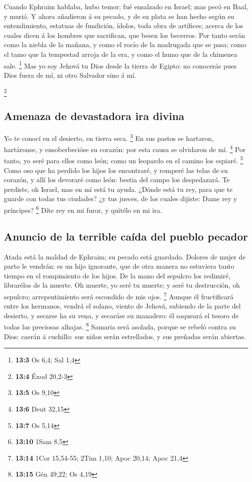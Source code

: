  Cuando Ephraim hablaba, hubo temor; fué ensalzado en
Israel; mas pecó en Baal, y murió.  Y ahora añadieron á su
pecado, y de su plata se han hecho según su entendimiento, estatuas de
fundición, ídolos, toda obra de artífices; acerca de los cuales dicen á
los hombres que sacrifican, que besen los becerros.  Por
tanto serán como la niebla de la mañana, y como el rocío de la madrugada
que se pasa; como el tamo que la tempestad arroja de la era, y como el
humo que de la chimenea sale. \footnote{\textbf{13:3} Os 6,4; Sal 1,4}
 Mas yo soy Jehová tu Dios desde la tierra de Egipto: no
conocerás pues Dios fuera de mí, ni otro Salvador sino á mí.

\footnote{\textbf{13:4} Éxod 20,2-3}

\hypertarget{amenaza-de-devastadora-ira-divina}{%
\subsection{Amenaza de devastadora ira
divina}\label{amenaza-de-devastadora-ira-divina}}

 Yo te conocí en el desierto, en tierra seca. \footnote{\textbf{13:5}
  Os 9,10}  En sus pastos se hartaron, hartáronse, y
ensoberbecióse su corazón: por esta causa se olvidaron de mí.
\footnote{\textbf{13:6} Deut 32,15}  Por tanto, yo seré para
ellos como león; como un leopardo en el camino los espiaré. \footnote{\textbf{13:7}
  Os 5,14}  Como oso que ha perdido los hijos los
encontraré, y romperé las telas de su corazón, y allí los devoraré como
león: bestia del campo los despedazará.  Te perdiste, oh
Israel, mas en mí está tu ayuda.  ¿Dónde está tu rey, para
que te guarde con todas tus ciudades? ¿y tus jueces, de los cuales
dijiste: Dame rey y príncipes? \footnote{\textbf{13:10} 1Sam 8,5}
 Díte rey en mi furor, y quitélo en mi ira.

\hypertarget{anuncio-de-la-terrible-cauxedda-del-pueblo-pecador}{%
\subsection{Anuncio de la terrible caída del pueblo
pecador}\label{anuncio-de-la-terrible-cauxedda-del-pueblo-pecador}}

 Atada está la maldad de Ephraim; su pecado está guardado.
 Dolores de mujer de parto le vendrán: es un hijo
ignorante, que de otra manera no estuviera tanto tiempo en el
rompimiento de los hijos.  De la mano del sepulcro los
redimiré, librarélos de la muerte. Oh muerte, yo seré tu muerte; y seré
tu destrucción, oh sepulcro; arrepentimiento será escondido de mis ojos.
\footnote{\textbf{13:14} 1Cor 15,54-55; 2Tim 1,10; Apoc 20,14; Apoc 21,4}
 Aunque él fructificará entre los hermanos, vendrá el
solano, viento de Jehová, subiendo de la parte del desierto, y secarse
ha su vena, y secaráse su manadero: él saqueará el tesoro de todas las
preciosas alhajas. \footnote{\textbf{13:15} Gén 49,22; Os 4,19}
 Samaria será asolada, porque se rebeló contra su Dios:
caerán á cuchillo: sus niños serán estrellados, y sus preñadas serán
abiertas.

